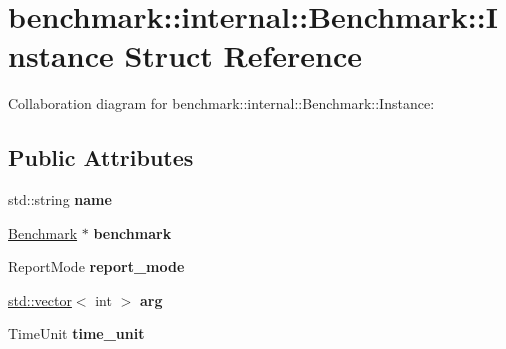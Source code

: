 \hypertarget{structbenchmark_1_1internal_1_1_benchmark_1_1_instance}{}\section{benchmark\+:\+:internal\+:\+:Benchmark\+:\+:Instance Struct Reference}
\label{structbenchmark_1_1internal_1_1_benchmark_1_1_instance}


Collaboration diagram for benchmark\+:\+:internal\+:\+:Benchmark\+:\+:Instance\+:
\subsection*{Public Attributes}
\begin{DoxyCompactItemize}
\item 
\mbox{\label{structbenchmark_1_1internal_1_1_benchmark_1_1_instance_ae0758e25bf5716d42ff28f8b48992616}} 
std\+::string {\bfseries name}
\item 
\mbox{\label{structbenchmark_1_1internal_1_1_benchmark_1_1_instance_a2410ba46be8c116771fea3867d7af822}} 
\mbox{\hyperlink{classbenchmark_1_1internal_1_1_benchmark}{Benchmark}} $\ast$ {\bfseries benchmark}
\item 
\mbox{\label{structbenchmark_1_1internal_1_1_benchmark_1_1_instance_addedaf1e84dcef8c39743c130e631236}} 
Report\+Mode {\bfseries report\+\_\+mode}
\item 
\mbox{\label{structbenchmark_1_1internal_1_1_benchmark_1_1_instance_a67565dbdbdf57daca2d44242d816fba7}} 
\mbox{\hyperlink{classstd_1_1vector}{std\+::vector}}$<$ int $>$ {\bfseries arg}
\item 
\mbox{\label{structbenchmark_1_1internal_1_1_benchmark_1_1_instance_a74ceb5ee96f3650f6ed1a46bc602d41b}} 
Time\+Unit {\bfseries time\+\_\+unit}
\item 
\mbox{\label{structbenchmark_1_1internal_1_1_benchmark_1_1_instance_ad14d1bc72606034f3d680001ba72a37f}} 

\end{DoxyCompactItemize}
